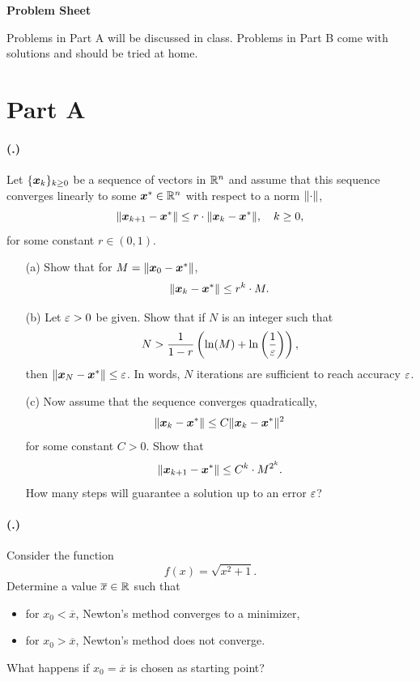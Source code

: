 \documentclass{article}
\newcounter{problemSheetNumber}
\newcounter{problems}
\renewcommand{\problem}{\paragraph{(\theproblemSheetNumber.\theproblems)}\addtocounter{problems}{1}}
\begin{document}
 
\begin{center}
{\Large {\bf Problem Sheet \theproblemSheetNumber}}
\end{center}

Problems in Part A will be discussed in class.
Problems in Part B come with solutions and should be tried at home. 


\section*{Part A}

\problem Let $\{\bm{x}_k\}_{k\geq 0}$ be a sequence of vectors in $\mathbb{R}^n$ and assume that this sequence converges linearly to some $\bm{x}^*\in \mathbb{R}^n$ with respect to a norm $\Vert {\cdot}\Vert$,
\begin{equation*}
 \Vert {\bm{x}_{k+1}-\bm{x}^*}\Vert \leq r\cdot \Vert {\bm{x}_k-\bm{x}^*}\Vert, \quad k\geq 0,
\end{equation*}
for some constant $r\in (0,1)$. 
\begin{itemize}
 \item[(a)] Show that for $M=\Vert {\bm{x}_0-\bm{x}^*}\Vert$, 
 \begin{equation*}
  \Vert {\bm{x}_k-\bm{x}^*}\Vert \leq r^k \cdot M.
 \end{equation*}
\item[(b)] Let $\varepsilon>0$ be given. Show that if $N$ is an integer such that
\begin{equation*}
 N> \frac{1}{1-r}\left(\ln(M)+\ln\left(\frac{1}{\varepsilon}\right)\right),
\end{equation*}
then $\Vert {\bm{x}_N-\bm{x}^*}\Vert\leq \varepsilon$. In words, $N$ iterations are sufficient to reach accuracy $\varepsilon$.
\item[(c)] Now assume that the sequence converges quadratically,
\begin{equation*}
 \Vert {\bm{x}_k-\bm{x}^*}\Vert\leq C\Vert {\bm{x}_k-\bm{x}^*}\Vert^2
\end{equation*}
for some constant $C>0$. Show that
\begin{equation*}
 \Vert {\bm{x}_{k+1}-\bm{x}^*}\Vert\leq C^k \cdot M^{2^k}.
\end{equation*}
How many steps will guarantee a solution up to an error $\varepsilon$?
\end{itemize}

 \problem Consider the function
 \begin{equation*}
  f(x) = \sqrt{x^2+1}.
 \end{equation*}
Determine a value $\overline{x}\in \mathbb{R}$ such that
\begin{itemize}
 \item for $x_0<\overline{x}$, Newton's method converges to a minimizer,
 \item for $x_0>\overline{x}$, Newton's method does not converge.
\end{itemize}
What happens if $x_0=\overline{x}$ is chosen as starting point?
 
\end{document}

